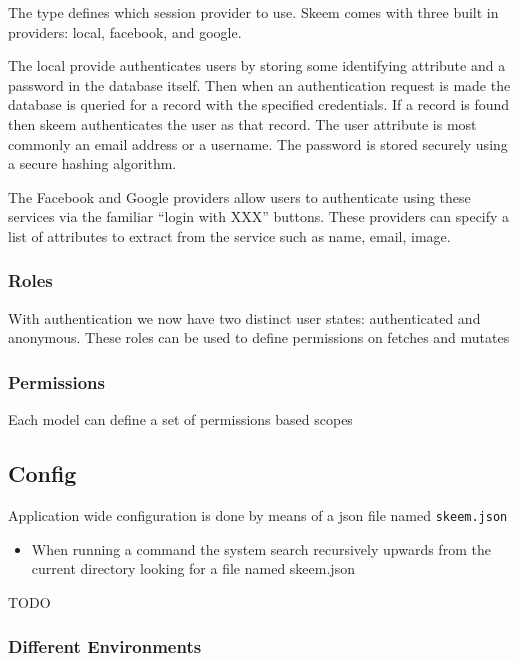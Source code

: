 \documentclass[
  12pt,
]{article}
\newcommand{\passthrough}[1]{#1}
\providecommand{\tightlist}{%
  \setlength{\itemsep}{0pt}\setlength{\parskip}{0pt}}
\begin{document}
The type defines which session provider to use. Skeem comes with three
built in providers: local, facebook, and google.

The local provide authenticates users by storing some identifying
attribute and a password in the database itself. Then when an
authentication request is made the database is queried for a record with
the specified credentials. If a record is found then skeem authenticates
the user as that record. The user attribute is most commonly an email
address or a username. The password is stored securely using a secure
hashing algorithm.

The Facebook and Google providers allow users to authenticate using
these services via the familiar ``login with XXX'' buttons. These
providers can specify a list of attributes to extract from the service
such as name, email, image.

\hypertarget{roles}{%
\subsubsection{Roles}\label{roles}}

With authentication we now have two distinct user states: authenticated
and anonymous. These roles can be used to define permissions on fetches
and mutates

\hypertarget{permissions}{%
\subsubsection{Permissions}\label{permissions}}

Each model can define a set of permissions based scopes

\hypertarget{config}{%
\subsection{Config}\label{config}}

Application wide configuration is done by means of a json file named
\passthrough{\lstinline!skeem.json!}

\begin{itemize}
\tightlist
\item
  When running a command the system search recursively upwards from the
  current directory looking for a file named skeem.json
\end{itemize}

TODO

\hypertarget{different-environments}{%
\subsubsection{Different Environments}\label{different-environments}}
\end{document}
